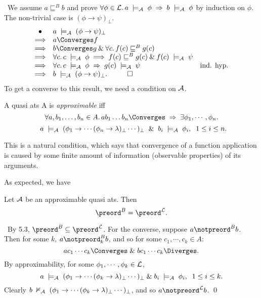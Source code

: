 \proof\ We assume $a \sqsubseteq^{B} b$ and prove $\forall \phi \in {\cal L} . \,  a \; \models_{{\cal A}} \; \phi \; \Rightarrow \;  b \; \models_{{\cal A}} \; \phi$ by induction on $\phi$. The non-trivial case is $(\phi \rightarrow \psi )_{\bot}$.
\[ \begin{array}{clr}
\bullet & a \; \models_{{\cal A}} \; (\phi \rightarrow \psi )_{\bot} & \\
\Longrightarrow & a \Converges f & \\ 
\Longrightarrow & b \Converges g \: \& \: \forall c . \, f(c) \sqsubseteq^{B} g(c) & \\ 
\Longrightarrow & \forall c . \,  c \; \models_{{\cal A}} \; \phi \; 
\Longrightarrow \;  f(c) \sqsubseteq^{B} g(c) \: \& \: f(c) \; \models_{{\cal A}} \; \psi & \\ 
\Longrightarrow & \forall c . \,  c \; \models_{{\cal A}} \; \phi \; \Rightarrow \;  g(c) \; \models_{{\cal A}} \; \psi & \mbox{ind. hyp.} \\ 
\Longrightarrow & b \; \models_{{\cal A}} \; (\phi \rightarrow \psi )_{\bot} . \;\;\; \qed 
\end{array} \]
To get a converse to this result, we need a condition on ${\cal A}$.
\begin{definition}
{\rm A quasi ats {\cal A} is {\em approximable} iff}
\[ \forall a, b_{1}, \ldots , b_{n} \in A . \, a b_{1} \ldots b_{n} \Converges \; \Rightarrow \; \exists \phi_{1} , \cdots , \phi_{n} . \]
\[ \;\; a \; \models_{{\cal A}} \; (\phi_{1} \rightarrow \cdots ( \phi_{n} \rightarrow \lambda )_{\bot} \cdots )_{\bot} \;\; \& \;\; b_{i} \; \models_{\cal A} \; \phi_{i} , \;\; 1 \leq i \leq n . \]
\end{definition}
This is a natural condition, which says that convergence of a function application is caused by some finite amount of information (observable properties) of its arguments.

As expected, we have
\begin{theorem}
Let ${\cal A}$ be an approximable quasi ats. Then
\[ {\preord^{B}} = {\preord^{\cal L}} . \]
\end{theorem}

\proof\ By 5.3, ${\preord^{B}} \subseteq {\preord^{\cal L}}$. For the converse, suppose $a \notpreord^{B} b$. Then for some $k$, $a \notpreord^{B}_{k} b$, and so for some $c_{1}, \cdots , c_{k} \in A$:
\[ a c_{1} \cdots c_{k} \Converges \; \& \; b c_{1} \cdots c_{k} \Diverges . \]
By approximability, for some $\phi_{1} , \cdots , \phi_{k} \in {\cal L}$,
\[ a \; \models_{{\cal A}} \; (\phi_{1} \rightarrow \cdots ( \phi_{k} \rightarrow \lambda )_{\bot} \cdots )_{\bot} \; \& \; b_{i} \; \models_{\cal A} \; \phi_{i} , \;\; 1 \leq i \leq k . \]
Clearly $b \; \nvDash_{{\cal A}} \; (\phi_{1} \rightarrow \cdots ( \phi_{k} \rightarrow \lambda )_{\bot} \cdots )_{\bot}$, and so $a \notpreord^{\cal L} b$. \qed

